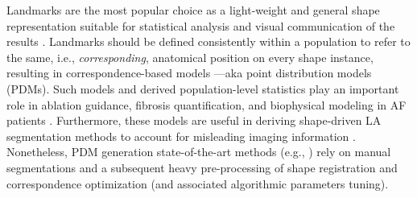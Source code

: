 \documentclass[twocolumn]{cinc}
\begin{document}
Landmarks are the most popular choice as a light-weight and general shape representation suitable for statistical analysis and visual communication of the results \cite{sarkalkan2014statistical}. Landmarks should be defined consistently within a population to refer to the same, i.e., \textit{corresponding}, anatomical position on every shape instance,  resulting in correspondence-based models ---aka point distribution models (PDMs). Such models and derived population-level statistics play an important role in ablation guidance, fibrosis quantification, and biophysical modeling in AF patients \cite{calkins20172017,marrouche2014decaaf,krueger2013silico}. Furthermore, these models are useful in deriving shape-driven LA segmentation methods to account for misleading imaging information \cite{tobon2015benchmark}. Nonetheless, PDM generation state-of-the-art methods (e.g., \cite{cates2017shapeworks,durrleman2014morphometry,styner2006spharm}) rely on manual segmentations and a subsequent heavy pre-processing of shape registration and correspondence optimization (and associated algorithmic parameters tuning).
\end{document}
